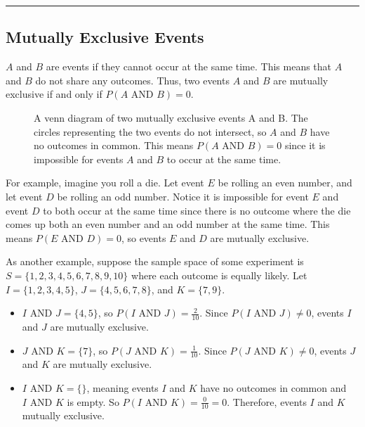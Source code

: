 \documentclass[letterpaper,10pt,english]{jupyterBook}
\begin{document}
\bigskip\hrule\bigskip



\subsection{Mutually Exclusive Events}
\label{\detokenize{Ch3 Probability/3.4 Addition Rules and Mutually Exclusive Events:mutually-exclusive-events}}
\sphinxAtStartPar
\(A\) and \(B\) are  events if they cannot occur at the same time. This means that \(A\) and \(B\) do not share any outcomes. Thus, two events \(A\) and \(B\) are mutually exclusive if and only if \(P(A \text{ AND } B) = 0\).

\begin{figure}[htbp]
\centering
\capstart

\noindent{}
\caption{A venn diagram of two mutually exclusive events A and B. The circles representing the two events do not intersect, so \(A\) and \(B\) have no outcomes in common. This means \(P(A \text{ AND } B) = 0\) since it is impossible for events \(A\) and \(B\) to occur at the same time.}\label{\detokenize{Ch3 Probability/3.4 Addition Rules and Mutually Exclusive Events:vennexcl}}\end{figure}

\sphinxAtStartPar
For example, imagine you roll a die. Let event \(E\) be rolling an even number, and let event \(D\) be rolling an odd number. Notice it is impossible for event \(E\) and event \(D\) to both occur at the same time since there is no outcome where the die comes up both an even number and an odd number at the same time. This means \(P(E \text{ AND } D) = 0\), so events \(E\) and \(D\) are mutually exclusive.

\sphinxAtStartPar
As another example, suppose the sample space of some experiment is \(S = \{1, 2, 3, 4, 5, 6, 7, 8, 9, 10\}\) where each outcome is equally likely. Let \(I = \{1, 2, 3, 4, 5\}\), \(J = \{4, 5, 6, 7, 8\}\), and \(K = \{7, 9\}\).
\begin{itemize}
\item {} 
\sphinxAtStartPar
\(I \text{ AND } J = \{4, 5\}\), so  \(P(I\text{ AND }J) = \frac{2}{10}\). Since \(P(I \text{ AND } J) \neq 0\), events \(I\) and \(J\) are  mutually exclusive.

\item {} 
\sphinxAtStartPar
\(J \text{ AND } K = \{7\}\), so \(P(J \text{ AND } K) = \frac{1}{10}\). Since \(P(J \text{ AND } K) \neq 0\), events \(J\) and \(K\) are  mutually exclusive.

\item {} 
\sphinxAtStartPar
\(I \text{ AND } K = \{\}\), meaning events \(I\) and \(K\) have no outcomes in common and \(I \text{ AND } K\) is empty. So \(P(I\text{ AND }K) = \frac{0}{10} = 0\). Therefore, events \(I\) and \(K\)  mutually exclusive.

\end{itemize}
\end{document}
